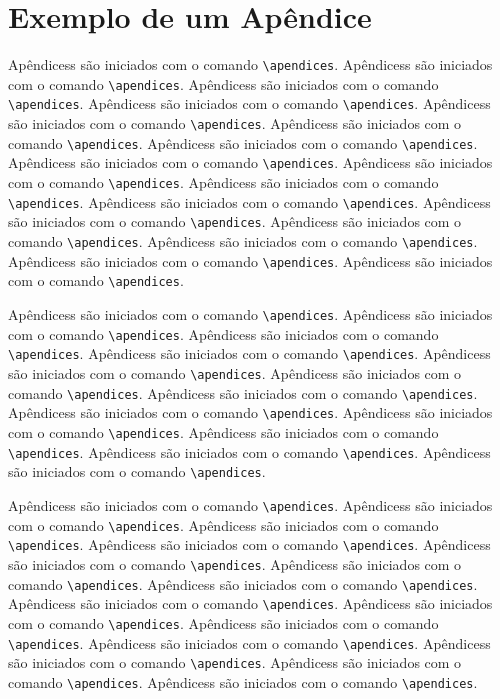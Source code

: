 \chapter{Exemplo de um Apêndice}
\label{apend:1}
Apêndicess são iniciados com o comando \verb|\apendices|.
Apêndicess são iniciados com o comando \verb|\apendices|.
Apêndicess são iniciados com o comando \verb|\apendices|.
Apêndicess são iniciados com o comando \verb|\apendices|.
Apêndicess são iniciados com o comando \verb|\apendices|.
Apêndicess são iniciados com o comando \verb|\apendices|.
Apêndicess são iniciados com o comando \verb|\apendices|.
Apêndicess são iniciados com o comando \verb|\apendices|.
Apêndicess são iniciados com o comando \verb|\apendices|.
Apêndicess são iniciados com o comando \verb|\apendices|.
Apêndicess são iniciados com o comando \verb|\apendices|.
Apêndicess são iniciados com o comando \verb|\apendices|.
Apêndicess são iniciados com o comando \verb|\apendices|.
Apêndicess são iniciados com o comando \verb|\apendices|.
Apêndicess são iniciados com o comando \verb|\apendices|.
Apêndicess são iniciados com o comando \verb|\apendices|.

Apêndicess são iniciados com o comando \verb|\apendices|.
Apêndicess são iniciados com o comando \verb|\apendices|.
Apêndicess são iniciados com o comando \verb|\apendices|.
Apêndicess são iniciados com o comando \verb|\apendices|.
Apêndicess são iniciados com o comando \verb|\apendices|.
Apêndicess são iniciados com o comando \verb|\apendices|.
Apêndicess são iniciados com o comando \verb|\apendices|.
Apêndicess são iniciados com o comando \verb|\apendices|.
Apêndicess são iniciados com o comando \verb|\apendices|.
Apêndicess são iniciados com o comando \verb|\apendices|.
Apêndicess são iniciados com o comando \verb|\apendices|.
Apêndicess são iniciados com o comando \verb|\apendices|.

Apêndicess são iniciados com o comando \verb|\apendices|.
Apêndicess são iniciados com o comando \verb|\apendices|.
Apêndicess são iniciados com o comando \verb|\apendices|.
Apêndicess são iniciados com o comando \verb|\apendices|.
Apêndicess são iniciados com o comando \verb|\apendices|.
Apêndicess são iniciados com o comando \verb|\apendices|.
Apêndicess são iniciados com o comando \verb|\apendices|.
Apêndicess são iniciados com o comando \verb|\apendices|.
Apêndicess são iniciados com o comando \verb|\apendices|.
Apêndicess são iniciados com o comando \verb|\apendices|.
Apêndicess são iniciados com o comando \verb|\apendices|.
Apêndicess são iniciados com o comando \verb|\apendices|.
Apêndicess são iniciados com o comando \verb|\apendices|.
Apêndicess são iniciados com o comando \verb|\apendices|.

